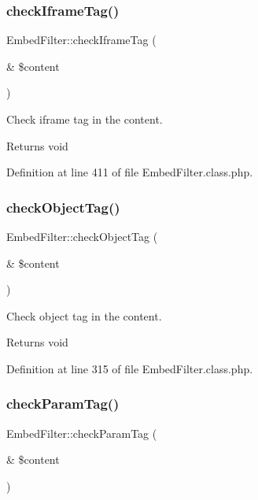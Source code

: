 \hypertarget{classEmbedFilter_a1026957e48eed307ee66c506f54a1847}{}\label{classEmbedFilter_a1026957e48eed307ee66c506f54a1847} 
\subsubsection{\texorpdfstring{check\+Iframe\+Tag()}{checkIframeTag()}}
{\footnotesize\ttfamily Embed\+Filter\+::check\+Iframe\+Tag (\begin{DoxyParamCaption}\item[{\&}]{\$content }\end{DoxyParamCaption})}

Check iframe tag in the content. \begin{DoxyReturn}{Returns}
void 
\end{DoxyReturn}


Definition at line 411 of file Embed\+Filter.\+class.\+php.

\hypertarget{classEmbedFilter_a3c703c014813fb916c72d95e964a3e0d}{}\label{classEmbedFilter_a3c703c014813fb916c72d95e964a3e0d} 
\subsubsection{\texorpdfstring{check\+Object\+Tag()}{checkObjectTag()}}
{\footnotesize\ttfamily Embed\+Filter\+::check\+Object\+Tag (\begin{DoxyParamCaption}\item[{\&}]{\$content }\end{DoxyParamCaption})}

Check object tag in the content. \begin{DoxyReturn}{Returns}
void 
\end{DoxyReturn}


Definition at line 315 of file Embed\+Filter.\+class.\+php.

\hypertarget{classEmbedFilter_ac0bed1ed95e5b5afb465051ad77d4569}{}\label{classEmbedFilter_ac0bed1ed95e5b5afb465051ad77d4569} 
\subsubsection{\texorpdfstring{check\+Param\+Tag()}{checkParamTag()}}
{\footnotesize\ttfamily Embed\+Filter\+::check\+Param\+Tag (\begin{DoxyParamCaption}\item[{\&}]{\$content }\end{DoxyParamCaption})}


